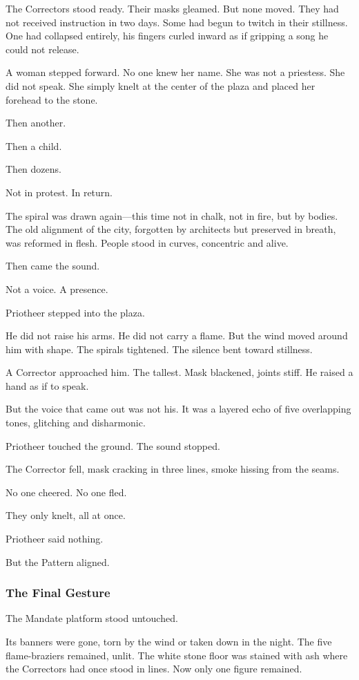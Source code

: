 \documentclass[12pt]{article}
\begin{document}
The Correctors stood ready. Their masks gleamed. But none moved. They had not received instruction in two days. Some had begun to twitch in their stillness. One had collapsed entirely, his fingers curled inward as if gripping a song he could not release.

A woman stepped forward. No one knew her name. She was not a priestess. She did not speak. She simply knelt at the center of the plaza and placed her forehead to the stone.

Then another.

Then a child.

Then dozens.

Not in protest. In return.

The spiral was drawn again—this time not in chalk, not in fire, but by bodies. The old alignment of the city, forgotten by architects but preserved in breath, was reformed in flesh. People stood in curves, concentric and alive.

Then came the sound.

Not a voice. A presence.

Priotheer stepped into the plaza.

He did not raise his arms. He did not carry a flame. But the wind moved around him with shape. The spirals tightened. The silence bent toward stillness.

A Corrector approached him. The tallest. Mask blackened, joints stiff. He raised a hand as if to speak.

But the voice that came out was not his. It was a layered echo of five overlapping tones, glitching and disharmonic.

Priotheer touched the ground. The sound stopped.

The Corrector fell, mask cracking in three lines, smoke hissing from the seams.

No one cheered. No one fled.

They only knelt, all at once.

Priotheer said nothing.

But the Pattern aligned.

\dotfill

\subsubsection*{The Final Gesture}

The Mandate platform stood untouched.

Its banners were gone, torn by the wind or taken down in the night. The five flame-braziers remained, unlit. The white stone floor was stained with ash where the Correctors had once stood in lines. Now only one figure remained.
\end{document}
